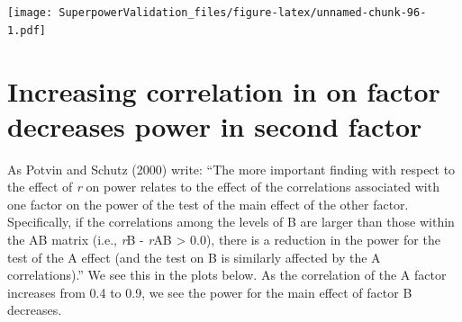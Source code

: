 \documentclass[]{book}
\newenvironment{Shaded}{\begin{snugshade}}{\end{snugshade}}
\newcommand{\DataTypeTok}[1]{\textcolor[rgb]{0.13,0.29,0.53}{#1}}
\newcommand{\FloatTok}[1]{\textcolor[rgb]{0.00,0.00,0.81}{#1}}
\newcommand{\KeywordTok}[1]{\textcolor[rgb]{0.13,0.29,0.53}{\textbf{#1}}}
\newcommand{\NormalTok}[1]{#1}
\newcommand{\OperatorTok}[1]{\textcolor[rgb]{0.81,0.36,0.00}{\textbf{#1}}}
\newcommand{\StringTok}[1]{\textcolor[rgb]{0.31,0.60,0.02}{#1}}
\begin{document}
\begin{Shaded}
\end{Shaded}

\texttt{[image: SuperpowerValidation\_files/figure-latex/unnamed-chunk-96-1.pdf]}

\hypertarget{increasing-correlation-in-on-factor-decreases-power-in-second-factor}{%
\section{Increasing correlation in on factor decreases power in second factor}\label{increasing-correlation-in-on-factor-decreases-power-in-second-factor}}

As Potvin and Schutz (2000) write: ``The more important finding with respect to the effect of \emph{r} on power relates to the effect of the correlations associated with one factor on the power of the test of the main effect of the other factor. Specifically, if the correlations among the levels of B are larger than those within the AB matrix (i.e., \emph{r}B - \emph{r}AB \textgreater{} 0.0), there is a reduction in the power for the test of the A effect (and the test on B is similarly affected by the A correlations).''
We see this in the plots below. As the correlation of the A factor increases from 0.4 to 0.9, we see the power for the main effect of factor B decreases.
\end{document}
